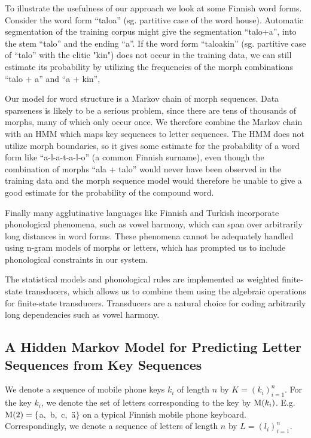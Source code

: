 \documentclass{llncs}
\begin{document}
To illustrate the usefulness of our approach we look at some Finnish
word forms. Consider the word form ``taloa'' (sg. partitive case of
the word house). Automatic segmentation of the training corpus might
give the segmentation ``talo+a'', into the stem ``talo'' and the ending
``a''. If the word form ``taloakin'' (sg. partitive case of ``talo'' with
the clitic "kin") does not occur in the training data, we can still
estimate its probability by utilizing the frequencies of the morph
combinations ``talo + a'' and ``a + kin'',

Our model for word structure is a Markov chain of morph
sequences. Data sparseness is likely to be a serious problem, since
there are tens of thousands of morphs, many of which only occur
once. We therefore combine the Markov chain with an
HMM which maps key sequences to letter sequences. The HMM does not
utilize morph boundaries, so it gives some estimate for the
probability of a word form like ``a-l-a-t-a-l-o'' (a common Finnish
surname), even though the combination of morphs ``ala + talo'' would never
have been observed in the training data and the morph sequence model
would therefore be unable to give a good estimate for the probability
of the compound word.

Finally many agglutinative languages like Finnish and Turkish
incorporate phonological phenomena, such as vowel harmony, which can
span over arbitrarily long distances in word forms. These phenomena
cannot be adequately handled using n-gram models of morphs or letters,
which has prompted us to include phonological constraints in our
system.

The statistical models and phonological rules are implemented as
weighted finite-state transducers, which allows us to combine them using
the algebraic operations for finite-state transducers. Transducers are
a natural choice for coding arbitrarily long dependencies such as
vowel harmony.

\subsection{A Hidden Markov Model for Predicting Letter Sequences from Key Sequences}

We denote a sequence of mobile phone keys $k_i$ of length $n$ by $K =
(k_i)_{i=1}^{n}$. For the key $k_i$, we denote the set of letters
corresponding to the key by ${\rm M}(k_i)$. E.g. ${\rm M}(2) =
\{$a,~b,~c,~\"{a}$\}$ on a typical Finnish mobile phone
keyboard. Correspondingly, we denote a sequence of letters of length
$n$ by $L = (l_i)_{i=1}^{n}$.
\end{document}
